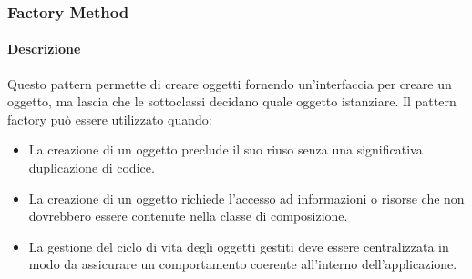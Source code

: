 \newpage
\subsubsection{Factory Method}
\paragraph{Descrizione}
Questo pattern permette di creare oggetti fornendo un'interfaccia per creare un oggetto, ma lascia che le sottoclassi decidano quale oggetto istanziare.
Il pattern factory può essere utilizzato quando:
\begin{itemize}
\item 
La creazione di un oggetto preclude il suo riuso senza una significativa duplicazione di codice.
\item 
La creazione di un oggetto richiede l'accesso ad informazioni o risorse che non dovrebbero essere contenute nella classe di composizione.
\item
La gestione del ciclo di vita degli oggetti gestiti deve essere centralizzata in modo da assicurare un comportamento coerente all'interno dell'applicazione.
\end{itemize}
